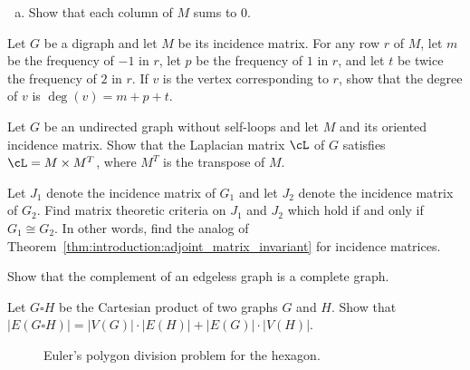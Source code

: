 \begin{problem}
\begin{enumerate}[(a)]
  \item Show that each column of $M$ sums to $0$.
  \end{enumerate}

\item Let $G$ be a digraph and let $M$ be its incidence matrix. For
  any row $r$ of $M$, let $m$ be the frequency of $-1$ in $r$, let
  $p$ be the frequency of $1$ in $r$, and let $t$ be twice the
  frequency of $2$ in $r$. If $v$ is the vertex corresponding to
  $r$, show that the degree of $v$ is $\deg(v) = m + p + t$.

\item Let $G$ be an undirected graph without self-loops and let $M$
  and its oriented incidence matrix. Show that the Laplacian matrix
  $\cL$ of $G$ satisfies $\cL = M \times M^T$, where
  $M^T$ is the transpose of $M$.

\item Let $J_1$ denote the incidence matrix of $G_1$ and let $J_2$
  denote the incidence matrix of $G_2$. Find matrix theoretic criteria
  on $J_1$ and $J_2$ which hold if and only if $G_1 \cong G_2$. In
  other words, find the analog of
  Theorem~\ref{thm:introduction:adjoint_matrix_invariant} for
  incidence matrices.

\item Show that the complement of an edgeless graph is a complete
  graph.

\item Let $G \square H$ be the Cartesian product of two graphs $G$ and
  $H$. Show that
  $|E(G \square H)| = |V(G)| \cdot |E(H)| + |E(G)| \cdot |V(H)|$.

\begin{figure}[!htbp]
\centering
{}

\caption{Euler's polygon division problem for the hexagon.}
\label{fig:introduction:Euler_polygon_division_hexagon}
\end{figure}


\end{problem}
